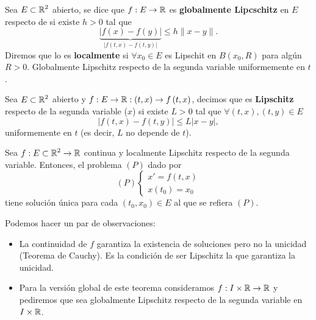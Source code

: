 \begin{definition}
Sea $\displaystyle E \subset \mathbb{R}^{2} $ abierto, se dice que $\displaystyle f : E \to \mathbb{R} $ es \textbf{globalmente Lipcschitz} en $\displaystyle E $ respecto de si existe $\displaystyle h > 0 $ tal que 
\[ \underbrace{\left|f\left(x\right)-f\left(y\right)\right|}_{ \left|f\left(t,x\right)-f\left(t,y\right)\right|} \leq h \| x - y\| .\]
Diremos que lo es \textbf{localmente} si $\displaystyle \forall x_{0} \in E$ es Lipschit en $\displaystyle B\left(x_{0}, R\right) $ para algún $\displaystyle R > 0 $. Globalmente Lipschitz respecto de la segunda variable uniformemente en $\displaystyle t $.
\end{definition}
\begin{definition}
Sea $\displaystyle E \subset \mathbb{R}^{2} $ abierto y $\displaystyle f : E \to \mathbb{R} : \left(t,x\right) \to f\left(t,x\right) $, decimos que es \textbf{Lipschitz} respecto de la segunda variable ($\displaystyle x $) si existe $\displaystyle L > 0 $ tal que $\displaystyle \forall \left(t,x\right), \left(t,y\right) \in E $
\[ \left|f\left(t,x\right)-f\left(t,y\right)\right| \leq L \left|x - y\right| ,\]
uniformemente en $\displaystyle t $ (es decir, $\displaystyle L $ no depende de $\displaystyle t $). 
\end{definition}
\begin{theorem}
Sea $\displaystyle f : E \subset \mathbb{R}^{2} \to \mathbb{R} $ continua y localmente Lipschitz respecto de la segunda variable. Entonces, el problema $\displaystyle \left(P\right) $ dado por 
\[ \left(P\right)
\begin{cases}
x' = f\left(t,x\right) \\
x\left(t_{0}\right) = x_{0}
\end{cases}
\]
tiene solución única para cada $\displaystyle \left(t_{0}, x_{0}\right) \in E $ al que se refiera $\displaystyle \left(P\right) $. 
\end{theorem}
\begin{observation} Podemos hacer un par de observaciones:
	\begin{itemize}
	\item La continuidad de $\displaystyle f $ garantiza la existencia de soluciones pero no la unicidad (Teorema de Cauchy). Es la condición de ser Lipschitz la que garantiza la unicidad. 
	\item Para la versión global de este teorema consideramos $\displaystyle f : I \times \mathbb{R} \to \mathbb{R} $ y pediremos que sea globalmente Lipschitz respecto de la segunda variable en $\displaystyle I \times \mathbb{R} $.
	\end{itemize}
\end{observation}
